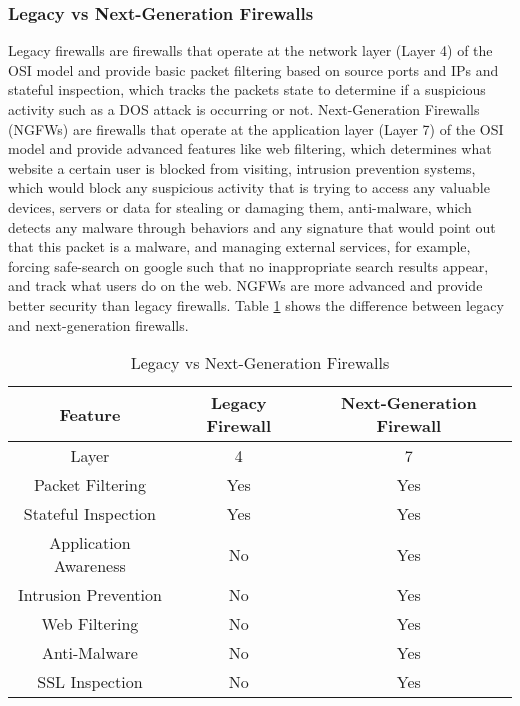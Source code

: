 \documentclass[12pt]{report}
\begin{document}
\subsubsection{Legacy vs Next-Generation Firewalls}
Legacy firewalls are firewalls that operate at the network layer (Layer 4) of the OSI model and provide basic packet filtering based on source ports and IPs and stateful inspection, which tracks the packets state to determine if a suspicious activity such as a DOS attack is occurring or not. Next-Generation Firewalls (NGFWs) are firewalls that operate at the application layer (Layer 7) of the OSI model and provide advanced features like web filtering, which determines what website a certain user is blocked from visiting, intrusion prevention systems, which would block any suspicious activity that is trying to access any valuable devices, servers or data for stealing or damaging them, anti-malware, which detects any malware through behaviors and any signature that would point out that this packet is a malware, and managing external services, for example, forcing safe-search on google such that no inappropriate search results appear, and track what users do on the web. NGFWs are more advanced and provide better security than legacy firewalls. Table \ref{tab:firewalls} shows the difference between legacy and next-generation firewalls. %
\begin{table}[h]
    \centering
    \begin{tabular}{|c|c|c|}
    \hline
    \textbf{Feature} & \textbf{Legacy Firewall} & \textbf{Next-Generation Firewall} \\ \hline
    Layer & 4 & 7 \\ \hline
    Packet Filtering & Yes & Yes \\ \hline
    Stateful Inspection & Yes & Yes \\ \hline
    Application Awareness & No & Yes \\ \hline
    Intrusion Prevention & No & Yes \\ \hline
    Web Filtering & No & Yes \\ \hline
    Anti-Malware & No & Yes \\ \hline
    SSL Inspection & No & Yes \\ \hline
    \end{tabular}
    \caption{Legacy vs Next-Generation Firewalls}
    \label{tab:firewalls}
\end{table}
\end{document}
